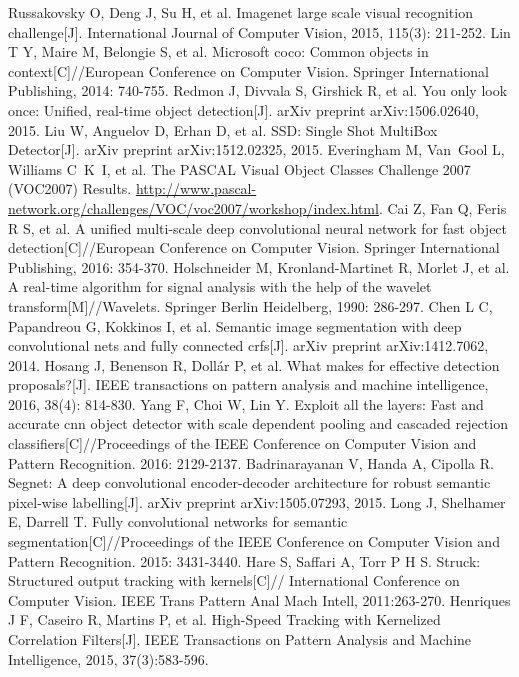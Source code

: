 \begin{thebibliography}{148}
Russakovsky O, Deng J, Su H, et al. Imagenet large scale visual recognition challenge[J]. International Journal of Computer Vision, 2015, 115(3): 211-252.
Lin T Y, Maire M, Belongie S, et al. Microsoft coco: Common objects in context[C]//European Conference on Computer Vision. Springer International Publishing, 2014: 740-755.
Redmon J, Divvala S, Girshick R, et al. You only look once: Unified, real-time object detection[J]. arXiv preprint arXiv:1506.02640, 2015.
Liu W, Anguelov D, Erhan D, et al. SSD: Single Shot MultiBox Detector[J]. arXiv preprint arXiv:1512.02325, 2015.
Everingham M, Van~Gool L, Williams C~K~I, et al. The {PASCAL} {V}isual {O}bject {C}lasses {C}hallenge 2007 {(VOC2007)}
{R}esults. \url{http://www.pascal-network.org/challenges/VOC/voc2007/workshop/index.html}.
Cai Z, Fan Q, Feris R S, et al. A unified multi-scale deep convolutional neural network for fast object detection[C]//European Conference on Computer Vision. Springer International Publishing, 2016: 354-370.
Holschneider M, Kronland-Martinet R, Morlet J, et al. A real-time algorithm for signal analysis with the help of the wavelet transform[M]//Wavelets. Springer Berlin Heidelberg, 1990: 286-297.
Chen L C, Papandreou G, Kokkinos I, et al. Semantic image segmentation with deep convolutional nets and fully connected crfs[J]. arXiv preprint arXiv:1412.7062, 2014.
Hosang J, Benenson R, Dollár P, et al. What makes for effective detection proposals?[J]. IEEE transactions on pattern analysis and machine intelligence, 2016, 38(4): 814-830.
Yang F, Choi W, Lin Y. Exploit all the layers: Fast and accurate cnn object detector with scale dependent pooling and cascaded rejection classifiers[C]//Proceedings of the IEEE Conference on Computer Vision and Pattern Recognition. 2016: 2129-2137.
Badrinarayanan V, Handa A, Cipolla R. Segnet: A deep convolutional encoder-decoder architecture for robust semantic pixel-wise labelling[J]. arXiv preprint arXiv:1505.07293, 2015.
Long J, Shelhamer E, Darrell T. Fully convolutional networks for semantic segmentation[C]//Proceedings of the IEEE Conference on Computer Vision and Pattern Recognition. 2015: 3431-3440.
Hare S, Saffari A, Torr P H S. Struck: Structured output tracking with kernels[C]// International Conference on Computer Vision. IEEE Trans Pattern Anal Mach Intell, 2011:263-270.
Henriques J F, Caseiro R, Martins P, et al. High-Speed Tracking with Kernelized Correlation Filters[J]. IEEE Transactions on Pattern Analysis and Machine Intelligence, 2015, 37(3):583-596.

\end{thebibliography}
